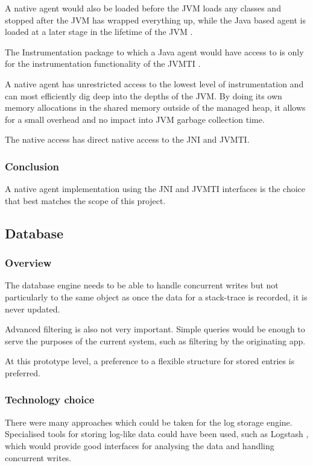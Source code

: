 A native agent would also be loaded before the JVM loads any classes and stopped after the JVM has wrapped everything up, while the Java based agent is loaded at a later stage in the lifetime of the JVM \cite{javavsnativetdyna}.

The Instrumentation package to which a Java agent would have access to is only for the instrumentation functionality of the JVMTI \cite{jvmtiInterface}.

A native agent has unrestricted access to the lowest level of instrumentation and can most efficiently dig deep into the depths of the JVM. By doing its own memory allocations in the shared memory outside of the managed heap, it allows for a small overhead and no impact into JVM garbage collection time.

The native access has direct native access to the JNI and JVMTI.

\subsubsection{Conclusion}
A native agent implementation using the JNI and JVMTI interfaces is the choice that best matches the scope of this project. 

\subsection{Database}
\subsubsection{Overview}
The database engine needs to be able to handle concurrent writes but not particularly to the same object as once the data for a stack-trace is recorded, it is never updated.

Advanced filtering is also not very important. Simple queries would be enough to serve the purposes of the current system, such as filtering by the originating app.

At this prototype level, a preference to a flexible structure for stored entries is preferred.

\subsubsection{Technology choice}
There were many approaches which could be taken for the log storage engine. Specialised tools for storing log-like data could have been used, such as Logstash \cite{logstash}, which would provide good interfaces for analysing the data and handling concurrent writes.


